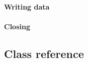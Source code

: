 \documentclass[a4paper,11pt]{report}
\begin{document}
\subsubsection{Writing data}

\subsubsection{Closing}





\begin{appendix}

\chapter{Class reference}

 
\end{appendix}







\end{document}

